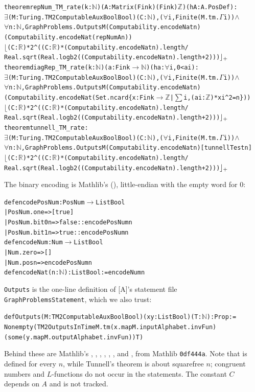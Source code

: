 \documentclass[10pt]{amsart}
\theoremstyle{plain}
\theoremstyle{definition}
\theoremstyle{remark}
\numberwithin{equation}{section}
\newcommand{\A}{\textup{[A]}}
\begin{document}
\begin{alltt}\footnotesize
theorem repNum_TM_rate (k : \(\mathbb{N}\)) (A : Matrix (Fin k) (Fin k) \(\mathbb{Z}\)) (hA : A.PosDef) :
    \(\exists\) (M : Turing.TM2ComputableAux Bool Bool) (C : \(\mathbb{N}\)), (\(\forall\) i, Finite (M.tm.\(\Gamma\) i)) \(\wedge\)
      \(\forall\) n : \(\mathbb{N}\), GraphProblems.Outputs M (Computability.encodeNat n)
        (Computability.encodeNat (repNum A n))
        \(\lfloor\)(C : \(\mathbb{R}\)) * 2 ^ ((C : \(\mathbb{R}\)) * (Computability.encodeNat n).length /
          Real.sqrt (Real.logb 2 ((Computability.encodeNat n).length + 2)))\(\rfloor\sb{+}\)
theorem diagRep_TM_rate (k : \(\mathbb{N}\)) (a : Fin k \(\to\) \(\mathbb{N}\)) (ha : \(\forall\) i, 0 < a i) :
    \(\exists\) (M : Turing.TM2ComputableAux Bool Bool) (C : \(\mathbb{N}\)), (\(\forall\) i, Finite (M.tm.\(\Gamma\) i)) \(\wedge\)
      \(\forall\) n : \(\mathbb{N}\), GraphProblems.Outputs M (Computability.encodeNat n)
        (Computability.encodeNat (Set.ncard \{x : Fin k \(\to\) \(\mathbb{Z}\) | \(\sum\) i, (a i : \(\mathbb{Z}\)) * x i ^ 2 = n\}))
        \(\lfloor\)(C : \(\mathbb{R}\)) * 2 ^ ((C : \(\mathbb{R}\)) * (Computability.encodeNat n).length /
          Real.sqrt (Real.logb 2 ((Computability.encodeNat n).length + 2)))\(\rfloor\sb{+}\)
theorem tunnell_TM_rate :
    \(\exists\) (M : Turing.TM2ComputableAux Bool Bool) (C : \(\mathbb{N}\)), (\(\forall\) i, Finite (M.tm.\(\Gamma\) i)) \(\wedge\)
      \(\forall\) n : \(\mathbb{N}\), GraphProblems.Outputs M (Computability.encodeNat n) [tunnellTest n]
        \(\lfloor\)(C : \(\mathbb{R}\)) * 2 ^ ((C : \(\mathbb{R}\)) * (Computability.encodeNat n).length /
          Real.sqrt (Real.logb 2 ((Computability.encodeNat n).length + 2)))\(\rfloor\sb{+}\)
\end{alltt}
The binary encoding is Mathlib's (), little-endian with the empty word for $0$:
\begin{alltt}\footnotesize
def encodePosNum : PosNum \(\to\) List Bool
  | PosNum.one => [true]
  | PosNum.bit0 n => false :: encodePosNum n
  | PosNum.bit1 n => true :: encodePosNum n
def encodeNum : Num \(\to\) List Bool
  | Num.zero => []
  | Num.pos n => encodePosNum n
def encodeNat (n : \(\mathbb{N}\)) : List Bool := encodeNum n
\end{alltt}
\texttt{Outputs} is the one-line definition of \A's statement file \texttt{GraphProblemsStatement}, which we
also trust:
\begin{alltt}\footnotesize
def Outputs (M : TM2ComputableAux Bool Bool) (x y : List Bool) (T : \(\mathbb{N}\)) : Prop :=
  Nonempty (TM2OutputsInTime M.tm (x.map M.inputAlphabet.invFun)
    (some (y.map M.outputAlphabet.invFun)) T)
\end{alltt}
Behind these are Mathlib's , , ,
, , ,  and ,
from Mathlib \texttt{0df444a}. Note that  is defined for every $n$, while Tunnell's theorem is
about squarefree $n$; congruent numbers and $L$-functions do not occur in the statements. The constant $C$
depends on $A$ and is not tracked.
\end{document}

